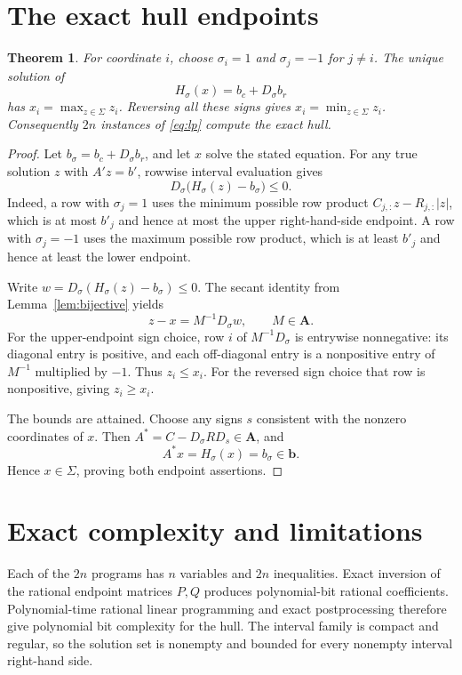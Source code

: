 \documentclass[11pt,a4paper]{article}
\newtheorem{theorem}{Theorem}
\theoremstyle{remark}\newtheorem{remark}[theorem]{Remark}
\begin{document}
\section{The exact hull endpoints}
\begin{theorem}\label{thm:hull}
For coordinate $i$, choose $\sigma_i=1$ and $\sigma_j=-1$ for $j\ne i$. The unique solution of
\[
 H_\sigma(x)=b_c+D_\sigma b_r
\]
has $x_i=\max_{z\in\Sigma}z_i$. Reversing all these signs gives $x_i=\min_{z\in\Sigma}z_i$. Consequently $2n$ instances of \eqref{eq:lp} compute the exact hull.
\end{theorem}
\begin{proof}
Let $b_\sigma=b_c+D_\sigma b_r$, and let $x$ solve the stated equation. For any true solution $z$ with $A'z=b'$, rowwise interval evaluation gives
\[
 D_\sigma\big(H_\sigma(z)-b_\sigma\big)\le0.
\]
Indeed, a row with $\sigma_j=1$ uses the minimum possible row product $C_{j,:}z-R_{j,:}|z|$, which is at most $b'_j$ and hence at most the upper right-hand-side endpoint. A row with $\sigma_j=-1$ uses the maximum possible row product, which is at least $b'_j$ and hence at least the lower endpoint.

Write $w=D_\sigma(H_\sigma(z)-b_\sigma)\le0$. The secant identity from Lemma~\ref{lem:bijective} yields
\[
 z-x=M^{-1}D_\sigma w,\qquad M\in\boldsymbol A.
\]
For the upper-endpoint sign choice, row $i$ of $M^{-1}D_\sigma$ is entrywise nonnegative: its diagonal entry is positive, and each off-diagonal entry is a nonpositive entry of $M^{-1}$ multiplied by $-1$. Thus $z_i\le x_i$. For the reversed sign choice that row is nonpositive, giving $z_i\ge x_i$.

The bounds are attained. Choose any signs $s$ consistent with the nonzero coordinates of $x$. Then $A^*=C-D_\sigma RD_s\in\boldsymbol A$, and
\[
 A^*x=H_\sigma(x)=b_\sigma\in\boldsymbol b.
\]
Hence $x\in\Sigma$, proving both endpoint assertions.
\end{proof}
\section{Exact complexity and limitations}
Each of the $2n$ programs has $n$ variables and $2n$ inequalities. Exact inversion of the rational endpoint matrices $P,Q$ produces polynomial-bit rational coefficients. Polynomial-time rational linear programming \cite{lp} and exact postprocessing therefore give polynomial bit complexity for the hull. The interval family is compact and regular, so the solution set is nonempty and bounded for every nonempty interval right-hand side.
\end{document}
